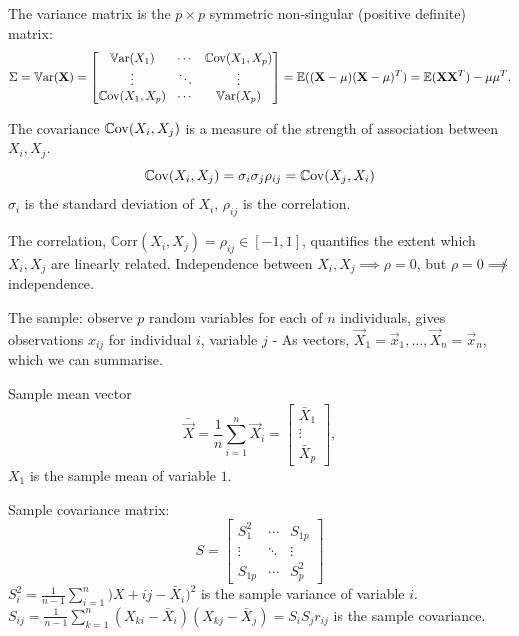 \documentclass[10pt, a4paper]{article}
\begin{document}
\begin{definition}
    The variance matrix is the $p \times p$ symmetric non-singular
    (positive definite)
    matrix:
    \[
    \Sigma = \mathbb{V}\mathrm{ar}(\mathbf{X}) = \begin{bmatrix}
        \mathbb{V}\mathrm{ar}(X_1) & \dotsi & \mathbb{C}\mathrm{ov}(X_1, X_p) \\
        \vdots & \ddots & \vdots \\
        \mathbb{C}\mathrm{ov}(X_1, X_p) & \dotsi & \mathbb{V}\mathrm{ar}(X_p)
    \end{bmatrix} = \mathbb{E}((\mathbf{X} - \mathbf{\mu})(\mathbf{X} - \mathbf{\mu}) ^ T) = \mathbb{E}(\mathbf{X}\mathbf{X} ^ T) - \mathbf{\mu}\mathbf{\mu} ^ T.
    \]
\end{definition}

\begin{definition}
    The covariance $\mathbb{C}\mathrm{ov}(X_i, X_j)$ is a measure of the strength of association between $X_i, X_j$.
    \[
    \mathbb{C}\mathrm{ov}(X_i, X_j) = \sigma_i\sigma_j\rho_{ij} = \mathbb{C}\mathrm{ov}(X_j, X_i)
    \]
    $\sigma_i$ is the standard deviation of $X_i$,
    $\rho_{ij}$ is the correlation.
\end{definition}

\begin{definition}
    The correlation,
    $\mathbb{C}\mathrm{orr}(X_i, X_j) = \rho_{ij} \in [-1, 1]$,
    quantifies the extent which $X_i, X_j$ are linearly related.
    Independence between $X_i, X_j \implies \rho = 0$,
    but $\rho = 0 \not\implies$ independence.
\end{definition}

The sample:
observe $p$ random variables for each of $n$ individuals,
gives observations $x_{ij}$ for individual $i$,
variable $j$ -
As vectors,
$\vec{X}_1 = \vec{x}_1, \dotsc, \vec{X}_n = \vec{x}_n$,
which we can summarise.

Sample mean vector
\[
\bar{\vec{X}} = \frac{1}{n}\sum_{i = 1}^{n}\vec{X}_i = \begin{bmatrix}
    \bar{X}_1 \\ \vdots \\ \bar{X}_p
\end{bmatrix},
\]
$X_1$ is the sample mean of variable $1$.

Sample covariance matrix:
\[
S = \begin{bmatrix}
    S_1 ^ 2 & \dotsi & S_{1p} \\
    \vdots & \ddots & \vdots \\
    S_{1p} & \dotsi & S_p ^ 2
\end{bmatrix}
\]
$S_i ^ 2 = \frac{1}{n - 1}\sum_{i = 1}^{n})X+{ij} - \bar{X}_i) ^ 2$ is the sample variance of variable $i$.
$S_{ij} = \frac{1}{n - 1}\sum_{k = 1}^{n}(X_{ki} - \bar{X}_i)(X_{kj} - \bar{X}_j) = S_iS_jr_{ij}$ is the sample covariance.
\end{document}
